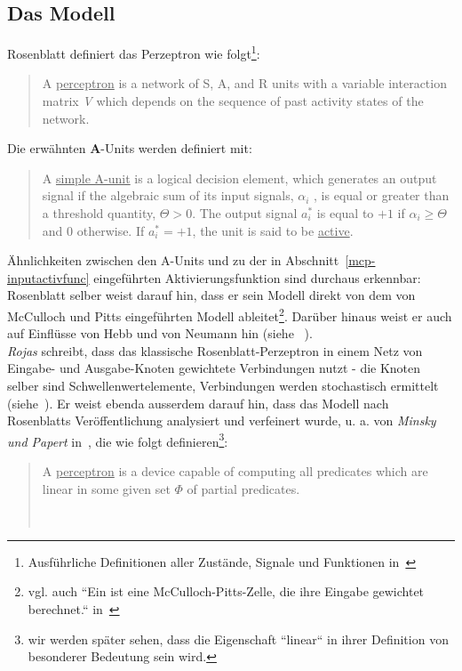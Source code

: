 \subsection{Das Modell}

Rosenblatt definiert das Perzeptron wie folgt\footnote{
    Ausführliche Definitionen aller Zustände, Signale und Funktionen in~\cite[79 - 94]{Ros62}
}:

\blockquote[{\cite[83 ``DEFINITION 17`` (Hervorhebung i.O.)]{Ros62}}]{
    A \underline{perceptron} is a network of S, A, and R units with a variable interaction matrix \textit{V} which depends on the
    sequence of past activity states of the network.
}

Die erwähnten \textbf{A}-Units werden definiert mit:

\blockquote[{\cite[81  ``DEFINITION 9`` (Hervorhebung i.O.)]{Ros62}}]{
    A \underline{simple A-unit} is a logical decision element, which
    generates an output signal if the algebraic sum of its
    input signals, $\alpha_i$ , is equal or greater than a threshold
    quantity, $\Theta > 0$. The output signal $a^*_i$ is equal to $+1$ if $\alpha_i \geq \Theta$ and $0$ otherwise. If $a^*_i = +1$,
    the unit is said to be \underline{active}.
}


Ähnlichkeiten zwischen den A-Units und zu der in Abschnitt~\ref{mcp-inputactivfunc} eingeführten Aktivierungsfunktion sind durchaus erkennbar: Rosenblatt selber weist darauf hin, dass er sein Modell direkt von dem von McCulloch und Pitts eingeführten Modell ableitet\footnote{
    vgl. auch ``Ein  ist eine McCulloch-Pitts-Zelle, die ihre Eingabe gewichtet berechnet.`` in~\cite[57, ``Definition 3.1`` (Hervorhebungen i.O.)]{Roj93}
}. Darüber hinaus weist er auch auf Einflüsse von Hebb und von Neumann hin (siehe ~\cite[5]{Ros62}).\\


\textit{Rojas} schreibt, dass das klassische Rosenblatt-Perzeptron in einem Netz von Eingabe- und Ausgabe-Knoten gewichtete Verbindungen nutzt - die Knoten selber sind Schwellenwertelemente, Verbindungen werden stochastisch ermittelt (siehe~\cite[51]{Roj93}).
Er weist ebenda ausserdem darauf hin, dass das Modell nach Rosenblatts Veröffentlichung analysiert und verfeinert wurde, u. a. von \textit{Minsky und Papert} in~\cite{MP88}, die wie folgt definieren\footnote{wir werden später sehen, dass die Eigenschaft ``linear`` in ihrer Definition von besonderer Bedeutung sein wird.}:

\blockquote[{~\cite[12, Hervorhebung i.O.]{MP88}}]{
    A \underline{perceptron} is a device capable of computing all predicates which are linear in some given set $\Phi$ of partial predicates.
}

